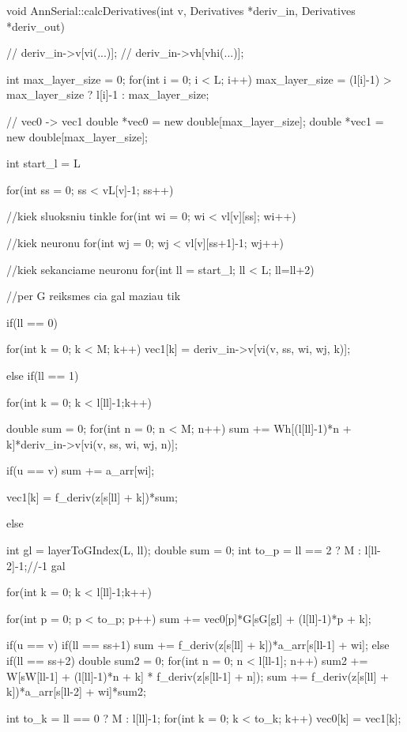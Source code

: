 void AnnSerial::calcDerivatives(int v, Derivatives *deriv\_in, Derivatives *deriv\_out){
  // deriv\_in->v[vi(...)];
  // deriv\_in->vh[vhi(...)];

  int max\_layer\_size = 0;
  for(int i = 0; i < L; i++)
    max\_layer\_size = (l[i]-1) > max\_layer\_size ? l[i]-1 : max\_layer\_size;

  // vec0 -> vec1
  double *vec0 = new double[max\_layer\_size];
  double *vec1 = new double[max\_layer\_size];


  int start\_l = L%

    for(int ss = 0; ss < vL[v]-1; ss++){//kiek sluoksniu tinkle
      for(int wi = 0; wi < vl[v][ss]; wi++){//kiek neuronu
        for(int wj = 0; wj < vl[v][ss+1]-1; wj++){//kiek sekanciame neuronu
          for(int ll = start\_l; ll < L; ll=ll+2){//per G reiksmes  cia gal maziau tik

            if(ll == 0){

              for(int k = 0; k < M; k++)
                vec1[k] = deriv\_in->v[vi(v, ss, wi, wj, k)];

            }else if(ll == 1){

              for(int k = 0; k < l[ll]-1;k++){
                double sum = 0;
                for(int n = 0; n < M; n++){
                  sum += Wh[(l[ll]-1)*n + k]*deriv\_in->v[vi(v, ss, wi, wj, n)];
                }

                if(u == v) sum += a\_arr[wi];

                vec1[k] = f\_deriv(z[s[ll] + k])*sum;
              }


            }else {


              int gl = layerToGIndex(L, ll);
              double sum = 0;
              int to\_p = ll == 2 ? M : l[ll-2]-1;//-1 gal


              for(int k = 0; k < l[ll]-1;k++){
                for(int p = 0; p < to\_p; p++){
                  sum += vec0[p]*G[sG[gl] + (l[ll]-1)*p + k];
                }


                if(u == v){
                  if(ll == ss+1)
                    sum += f\_deriv(z[s[ll] + k])*a\_arr[s[ll-1] + wi];
                  else if(ll == ss+2){
                      double sum2 = 0;
                      for(int n = 0; n < l[ll-1]; n++)
                       sum2 += W[sW[ll-1] + (l[ll]-1)*n + k] * f\_deriv(z[s[ll-1] + n]);
                      sum += f\_deriv(z[s[ll] + k])*a\_arr[s[ll-2] + wi]*sum2;
                  }
                }
              }
            }
            int to\_k = ll == 0 ? M : l[ll]-1;
            for(int k = 0; k < to\_k; k++) vec0[k] = vec1[k];

}}}}}
